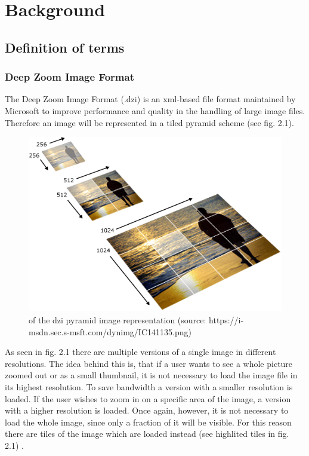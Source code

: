 \chapter{Background}
\section{Definition of terms}
\subsection{Deep Zoom Image Format}
The Deep Zoom Image Format (.dzi) is an xml-based file format maintained by Microsoft to improve performance and quality in the handling of large image files. Therefore an image will be represented in a tiled pyramid scheme (see fig. 2.1).
			
	\begin{figure}[!htbp]
		\begin{center}
			\includegraphics[scale=0.5]{img/dzi_pyramid.png}
				\caption{of the dzi pyramid image representation (source: https://i-msdn.sec.s-msft.com/dynimg/IC141135.png)}
			\label{fig:fig2.1}
		\end{center}
	\end{figure}

As seen in fig. 2.1 there are multiple versions of a single image in different resolutions. The idea behind this is, that if a user wants to see a whole picture zoomed out or as a small thumbnail, it is not necessary to load the image file in its highest resolution. To save bandwidth a version with a smaller resolution is loaded. If the user wishes to zoom in on a specific area of the image, a version with a higher resolution is loaded. Once again, however, it is not necessary to load the whole image, since only a fraction of it will be visible. For this reason there are tiles of the image which are loaded instead (see highlited tiles in fig. 2.1) \cite{web:dzi}.

